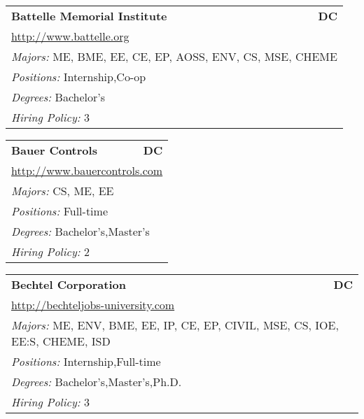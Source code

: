\documentclass[twoside]{article}
\begin{document}
\begin{center}
\begin{multicols}{3}
\begin{FlushLeft}
\begin{minipage}{.9\columnwidth}
\end{minipage}
 
\begin{minipage}{.9\columnwidth}\begin{tabularx}{.95\columnwidth}{Xr}
                 {\Large\bf Battelle Memorial Institute} & {\Large\bf DC}\\
    \multicolumn{2}{p{.95\columnwidth}}{\url{http://www.battelle.org}}\\
    \multicolumn{2}{p{.95\columnwidth}}{\emph{Majors:} ME, BME, EE, CE, EP, AOSS, ENV, CS, MSE, CHEME}\\
    \multicolumn{2}{p{.95\columnwidth}}{\emph{Positions:} Internship,Co-op}\\
    \multicolumn{2}{p{.95\columnwidth}}{\emph{Degrees:} Bachelor's}\\
    \multicolumn{2}{p{.95\columnwidth}}{\emph{Hiring Policy:} 3}\\
    \end{tabularx}
    
\end{minipage}
 
\begin{minipage}{.9\columnwidth}\begin{tabularx}{.95\columnwidth}{Xr}
                 {\Large\bf Bauer Controls} & {\Large\bf DC}\\
    \multicolumn{2}{p{.95\columnwidth}}{\url{http://www.bauercontrols.com}}\\
    \multicolumn{2}{p{.95\columnwidth}}{\emph{Majors:} CS, ME, EE}\\
    \multicolumn{2}{p{.95\columnwidth}}{\emph{Positions:} Full-time}\\
    \multicolumn{2}{p{.95\columnwidth}}{\emph{Degrees:} Bachelor's,Master's}\\
    \multicolumn{2}{p{.95\columnwidth}}{\emph{Hiring Policy:} 2}\\
    \end{tabularx}
    
\end{minipage}
 
\begin{minipage}{.9\columnwidth}\begin{tabularx}{.95\columnwidth}{Xr}
                 {\Large\bf Bechtel Corporation} & {\Large\bf DC}\\
    \multicolumn{2}{p{.95\columnwidth}}{\url{http://bechteljobs-university.com}}\\
    \multicolumn{2}{p{.95\columnwidth}}{\emph{Majors:} ME, ENV, BME, EE, IP, CE, EP, CIVIL, MSE, CS, IOE, EE:S, CHEME, ISD}\\
    \multicolumn{2}{p{.95\columnwidth}}{\emph{Positions:} Internship,Full-time}\\
    \multicolumn{2}{p{.95\columnwidth}}{\emph{Degrees:} Bachelor's,Master's,Ph.D.}\\
    \multicolumn{2}{p{.95\columnwidth}}{\emph{Hiring Policy:} 3}\\
    \end{tabularx}
    

\end{minipage}
\end{FlushLeft}
\end{multicols}
\end{center}
\end{document}
